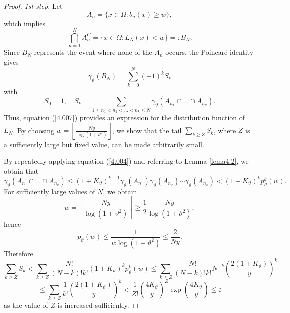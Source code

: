 \documentclass[final,1p,times]{elsarticle}
\numberwithin{equation}{section}
\begin{document}
\begin{proof}
\textit{1st step.} Let
\[
A_n = \{x \in \Omega: b_n(x) \geq w\},
\]
which implies
\[
\bigcap_{n=1}^{N} A_n^C = \{x \in \Omega: L_N(x) < w\} =: B_N.
\]
Since \( B_N \) represents the event where none of the \( A_n \) occurs, the Poincaré identity gives
\begin{equation}
\gamma_{\vartheta} (B_N) = \sum_{k=0}^{N} (-1)^k S_k \label{4.007}
\end{equation}
with
\[
S_0 = 1, \quad S_k = \sum_{1 \leq n_1 < n_2 < \ldots < n_k \leq N} \gamma_{\vartheta} \left( A_{n_1} \cap \ldots \cap A_{n_k} \right).
\]
Thus, equation (\ref{4.007}) provides an expression for the distribution function of \( L_N \). By choosing \( w = \left\lfloor \frac{N y}{\log(1+\vartheta^2)} \right\rfloor \), we show that the tail \( \sum_{k \geq Z} S_k \), where \( Z \) is a sufficiently large but fixed value, can be made arbitrarily small.

By repeatedly applying equation (\ref{4.004}) and referring to Lemma \ref{lema4.2}, we obtain that
\begin{equation} \label{4.008} 
\gamma_{\vartheta} \left( A_{n_1} \cap \ldots \cap A_{n_k}\right) \leq (1+K_{\vartheta})^{k-1} \gamma_{\vartheta}(A_{n_1})\gamma_{\vartheta}(A_{n_2}) \cdots \gamma_{\vartheta}(A_{n_k}) < (1+K_{\vartheta})^k p_{\vartheta}^k(w).
\end{equation}
For sufficiently large values of \( N \), we obtain
\[
w = \left\lfloor \frac{N y}{\log(1+\vartheta^2)} \right\rfloor \geq \frac{1}{2} \frac{N y}{\log(1+\vartheta^2)},
\]
hence
\[
p_{\vartheta}(w) \leq \frac{1}{w \log(1+\vartheta^2)} \leq \frac{2}{Ny}.
\]
Therefore
\[
\sum_{k \geq Z} S_k < \sum_{k \geq Z} \frac{N!}{(N-k)!k!} (1+K_{\vartheta})^k p_{\vartheta}^k(w) \leq \sum_{k \geq Z} \frac{N!}{(N-k)!k!} N^{-k} \left( \frac{2(1+K_{\vartheta})}{y} \right)^k
\]
\begin{equation} \label{4.0800} 
\leq \sum_{k \geq Z} \frac{1}{k!} \left( \frac{2(1+K_{\vartheta})}{y} \right)^k < \frac{1}{Z!} \left( \frac{4K_{\vartheta}}{y} \right)^Z \exp\left( \frac{4K_{\vartheta}}{y} \right) \leq \varepsilon
\end{equation}
as the value of \( Z \) is increased sufficiently.


\end{proof}
\end{document}
